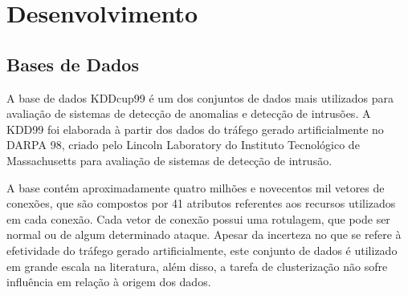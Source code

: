 \chapter{Desenvolvimento}

  \section{Bases de Dados}

\indent A base de dados KDDcup99 \cite{kdd99} é um dos conjuntos de dados mais utilizados para avaliação de sistemas de detecção de anomalias e detecção de intrusões. A KDD99 foi elaborada à partir dos dados do tráfego gerado artificialmente no DARPA 98, criado pelo Lincoln Laboratory do Instituto Tecnológico de Massachusetts para avaliação de sistemas de detecção de intrusão.

\indent A base contém aproximadamente quatro milhões e novecentos mil vetores de conexões, que são compostos por 41 atributos referentes aos recursos utilizados em cada conexão. Cada vetor de conexão possui uma rotulagem, que pode ser normal ou de algum determinado ataque. Apesar da incerteza no que se refere à efetividade do tráfego gerado artificialmente, este conjunto de dados é utilizado em grande escala na literatura, além disso, a tarefa de clusterização não sofre influência em relação à origem dos dados.


